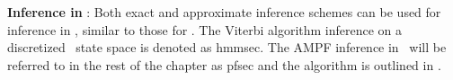 \noindent \textbf{Inference in \spmodel}: Both exact and approximate inference schemes can be used for inference in \spmodel, similar to those for \bpmodel. The Viterbi algorithm inference on a discretized \spmodel\ state space is denoted as \acrshort{hmmsec}. The \gls{AMPF} inference in \spmodel\ will be referred to in the rest of the chapter as \acrshort{pfsec} and the algorithm is outlined in . 
% 
% 
